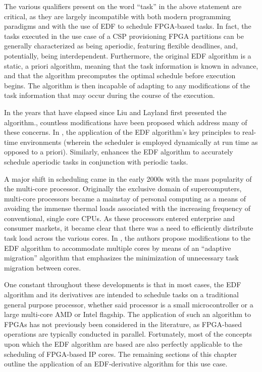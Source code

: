 The various qualifiers present on the word ``task'' in the above statement are critical, as they are largely incompatible with both modern programming paradigms and with the use of EDF to schedule FPGA-based tasks. In fact, the tasks executed in the use case of a CSP provisioning FPGA partitions can be generally characterized as being aperiodic, featuring flexible deadlines, and, potentially, being interdependent. Furthermore, the original EDF algorithm is a static, a priori algorithm, meaning that the task information is known in advance, and that the algorithm precomputes the optimal schedule before execution begins. The algorithm is then incapable of adapting to any modifications of the task information that may occur during the course of the execution.

In the years that have elapsed since Liu and Layland first presented the algorithm., countless modifications have been proposed which address many of these concerns. In \cite{stankovic_deadline_1998}, the application of the EDF algorithm's key principles to real-time environments (wherein the scheduler is employed dynamically at run time as opposed to a priori). Similarly, \cite{spuri_efficient_1994} enhances the EDF algorithm to accurately schedule aperiodic tasks in conjunction with periodic tasks.

A major shift in scheduling came in the early 2000s with the mass popularity of the multi-core processor. Originally the exclusive domain of supercomputers, multi-core processors became a mainstay of personal computing as a means of avoiding the immense thermal loads associated with the increasing frequency of conventional, single core CPUs. As these processors entered enterprise and consumer markets, it became clear that there was a need to efficiently distribute task load across the various cores. In \cite{abeni_edf_2020}, the authors propose modifications to the EDF algorithm to accommodate multiple cores by means of an ``adaptive migration'' algorithm that emphasizes the minimization of unnecessary task migration between cores.

One constant throughout these developments is that in most cases, the EDF algorithm and its derivatives are intended to schedule tasks on a traditional general purpose processor, whether said processor is a small microcontroller or a large multi-core AMD or Intel flagship. The application of such an algorithm to FPGAs has not previously been considered in the literature, as FPGA-based operations are typically conducted in parallel. Fortunately, most of the concepts upon which the EDF algorithm are based are also perfectly applicable to the scheduling of FPGA-based IP cores. The remaining sections of this chapter outline the application of an EDF-derivative algorithm for this use case.

